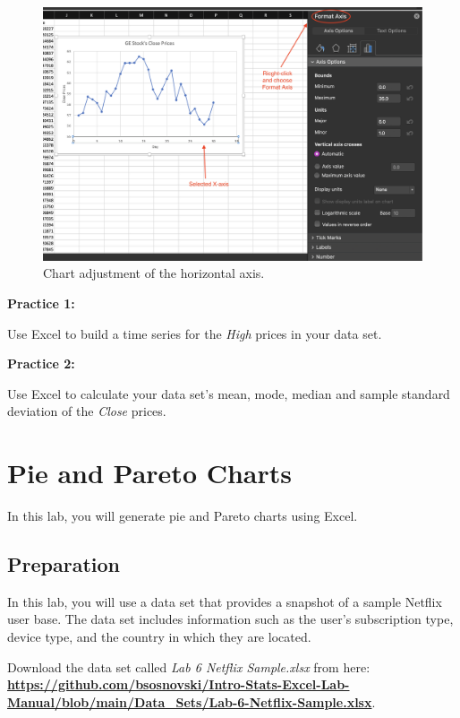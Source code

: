 \documentclass[
]{book}
\begin{document}
\begin{figure}

{\centering \includegraphics[width=0.8\linewidth]{adjust-axis} 

}

\caption{Chart adjustment of the horizontal axis.}\label{fig:adjust-axis}
\end{figure}

\textbf{Practice 1:}

Use Excel to build a time series for the \emph{High} prices in your data set.

\textbf{Practice 2:}

Use Excel to calculate your data set's mean, mode, median and sample standard deviation of the \emph{Close} prices.

\hypertarget{pie-and-pareto-charts}{%
\chapter{Pie and Pareto Charts}\label{pie-and-pareto-charts}}

In this lab, you will generate pie and Pareto charts using Excel.

\hypertarget{preparation-3}{%
\section{Preparation}\label{preparation-3}}

In this lab, you will use a data set that provides a snapshot of a sample Netflix user base. The data set includes information such as the user's subscription type, device type, and the country in which they are located.

Download the data set called \emph{Lab 6 Netflix Sample.xlsx} from here: \href{https://github.com/bsosnovski/Intro-Stats-Excel-Lab-Manual/blob/main/Data_Sets/Lab-6-Netflix-Sample.xlsx}{\textbf{https://github.com/bsosnovski/Intro-Stats-Excel-Lab-Manual/blob/main/Data\_Sets/Lab-6-Netflix-Sample.xlsx}}.
\end{document}
